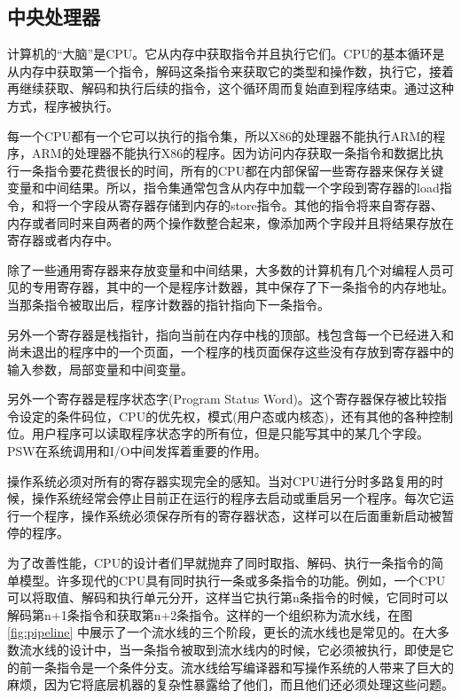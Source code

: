 \subsection{中央处理器}

	计算机的“大脑”是CPU。它从内存中获取指令并且执行它们。CPU的基本循环是从内存中获取第一个指令，解码这条指令来获取它的类型和操作数，执行它，接着再继续获取、解码和执行后续的指令，这个循环周而复始直到程序结束。通过这种方式，程序被执行。
	
	每一个CPU都有一个它可以执行的指令集，所以X86的处理器不能执行ARM的程序，ARM的处理器不能执行X86的程序。因为访问内存获取一条指令和数据比执行一条指令要花费很长的时间，所有的CPU都在内部保留一些寄存器来保存关键变量和中间结果。所以，指令集通常包含从内存中加载一个字段到寄存器的load指令，和将一个字段从寄存器存储到内存的store指令。其他的指令将来自寄存器、内存或者同时来自两者的两个操作数整合起来，像添加两个字段并且将结果存放在寄存器或者内存中。
	
	除了一些通用寄存器来存放变量和中间结果，大多数的计算机有几个对编程人员可见的专用寄存器，其中的一个是程序计数器，其中保存了下一条指令的内存地址。当那条指令被取出后，程序计数器的指针指向下一条指令。
	
	另外一个寄存器是栈指针，指向当前在内存中栈的顶部。栈包含每一个已经进入和尚未退出的程序中的一个页面，一个程序的栈页面保存这些没有存放到寄存器中的输入参数，局部变量和中间变量。
	
	另外一个寄存器是程序状态字(Program Status Word)。这个寄存器保存被比较指令设定的条件码位，CPU的优先权，模式(用户态或内核态)，还有其他的各种控制位。用户程序可以读取程序状态字的所有位，但是只能写其中的某几个字段。PSW在系统调用和I/O中间发挥着重要的作用。
	
	操作系统必须对所有的寄存器实现完全的感知。当对CPU进行分时多路复用的时候，操作系统经常会停止目前正在运行的程序去启动或重启另一个程序。每次它运行一个程序，操作系统必须保存所有的寄存器状态，这样可以在后面重新启动被暂停的程序。
	
	为了改善性能，CPU的设计者们早就抛弃了同时取指、解码、执行一条指令的简单模型。许多现代的CPU具有同时执行一条或多条指令的功能。例如，一个CPU可以将取值、解码和执行单元分开，这样当它执行第n条指令的时候，它同时可以解码第n+1条指令和获取第n+2条指令。这样的一个组织称为流水线，在图 \ref{fig:pipeline} 中展示了一个流水线的三个阶段，更长的流水线也是常见的。在大多数流水线的设计中，当一条指令被取到流水线内的时候，它必须被执行，即使是它的前一条指令是一个条件分支。流水线给写编译器和写操作系统的人带来了巨大的麻烦，因为它将底层机器的复杂性暴露给了他们，而且他们还必须处理这些问题。

